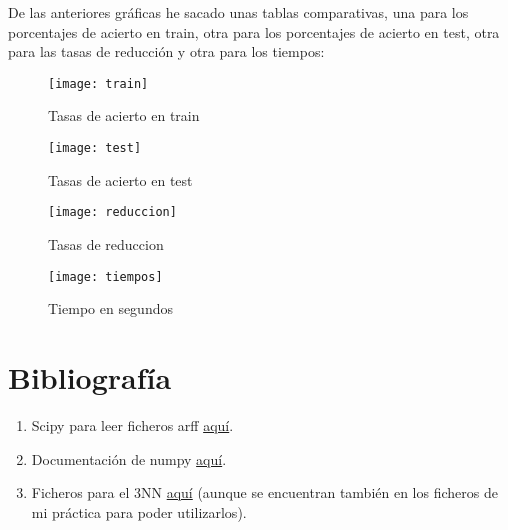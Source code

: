 \documentclass[12pt]{article}
\begin{document}
De las anteriores gráficas he sacado unas tablas comparativas, una para los porcentajes de acierto en train, otra para los porcentajes de acierto en test, otra para las tasas de reducción y otra para los tiempos:

\begin{figure}[H]
\centering
\texttt{[image: train]}
\caption{Tasas de acierto en train} \label{fig:train}
\end{figure}

\begin{figure}[H]
\centering
\texttt{[image: test]}
\caption{Tasas de acierto en test} \label{fig:test}
\end{figure}

\begin{figure}[H]
\centering
\texttt{[image: reduccion]}
\caption{Tasas de reduccion} \label{fig:reduccion}
\end{figure}

\begin{figure}[H]
\centering
\texttt{[image: tiempos]}
\caption{Tiempo en segundos} \label{fig:tiempos}
\end{figure}

\section{Bibliografía}
\begin{enumerate}
\item Scipy para leer ficheros arff \href{arff http://docs.scipy.org/doc/scipy/reference/generated/scipy.io.arff.loadarff.html}{aquí}.
\item Documentación de numpy \href{http://docs.scipy.org/doc/numpy/user/index.html}{aquí}.
\item Ficheros para el 3NN \href{https://github.com/agarciamontoro/metaheuristics/tree/master/src/knnGPU}{aquí} (aunque se encuentran también en los ficheros de mi práctica para poder utilizarlos).
\end{enumerate}
\end{document}
